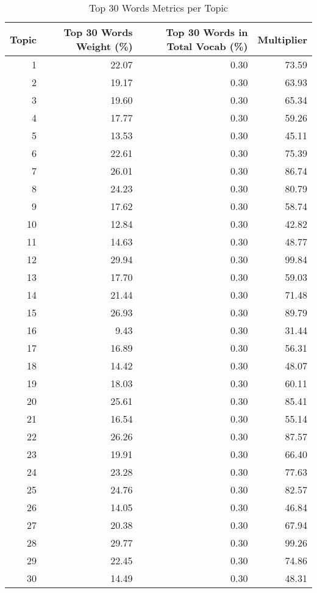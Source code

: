 \documentclass[12pt,letterpaper]{article}
\begin{document}
\begin{enumerate}
\begin{enumerate}

		


\begin{table}[ht]
	\centering
	\caption{Top 30 Words Metrics per Topic}
	\label{tab:metrics}
	\begin{tabular}{rrrr}
		\toprule
		Topic & Top 30 Words Weight (\%) & Top 30 Words in Total Vocab (\%) & Multiplier \\
		\midrule
		1 & 22.07 & 0.30 & 73.59 \\
		2 & 19.17 & 0.30 & 63.93 \\
		3 & 19.60 & 0.30 & 65.34 \\
		4 & 17.77 & 0.30 & 59.26 \\
		5 & 13.53 & 0.30 & 45.11 \\
		6 & 22.61 & 0.30 & 75.39 \\
		7 & 26.01 & 0.30 & 86.74 \\
		8 & 24.23 & 0.30 & 80.79 \\
		9 & 17.62 & 0.30 & 58.74 \\
		10 & 12.84 & 0.30 & 42.82 \\
		11 & 14.63 & 0.30 & 48.77 \\
		12 & 29.94 & 0.30 & 99.84 \\
		13 & 17.70 & 0.30 & 59.03 \\
		14 & 21.44 & 0.30 & 71.48 \\
		15 & 26.93 & 0.30 & 89.79 \\
		16 & 9.43 & 0.30 & 31.44 \\
		17 & 16.89 & 0.30 & 56.31 \\
		18 & 14.42 & 0.30 & 48.07 \\
		19 & 18.03 & 0.30 & 60.11 \\
		20 & 25.61 & 0.30 & 85.41 \\
		21 & 16.54 & 0.30 & 55.14 \\
		22 & 26.26 & 0.30 & 87.57 \\
		23 & 19.91 & 0.30 & 66.40 \\
		24 & 23.28 & 0.30 & 77.63 \\
		25 & 24.76 & 0.30 & 82.57 \\
		26 & 14.05 & 0.30 & 46.84 \\
		27 & 20.38 & 0.30 & 67.94 \\
		28 & 29.77 & 0.30 & 99.26 \\
		29 & 22.45 & 0.30 & 74.86 \\
		30 & 14.49 & 0.30 & 48.31 \\
		\bottomrule
	\end{tabular}
	\end{table}

	\end{enumerate}
\end{enumerate}
\end{document}
